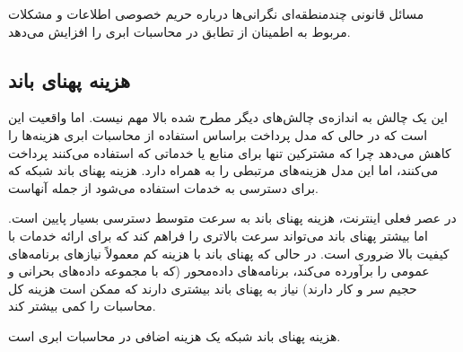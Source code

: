 \documentclass{book}
\begin{document}
    \begin{addinfo}
        
        مسائل قانونی چندمنطقه‌ای نگرانی‌ها درباره حریم خصوصی اطلاعات و مشکلات مربوط به اطمینان از تطابق در محاسبات ابری را افزایش می‌دهد.
        
    \end{addinfo}

    \subsection{هزینه پهنای باند}

        این یک چالش به اندازه‌ی چالش‌های دیگر مطرح شده بالا مهم نیست. اما واقعیت این است که در حالی که مدل پرداخت براساس استفاده از محاسبات ابری هزینه‌ها را کاهش می‌دهد چرا که مشترکین تنها برای منابع یا خدماتی که استفاده می‌کنند پرداخت می‌کنند، اما این مدل هزینه‌های مرتبطی را به همراه دارد. هزینه پهنای باند شبکه که برای دسترسی به خدمات استفاده می‌شود از جمله آنهاست.

        در عصر فعلی اینترنت، هزینه پهنای باند به سرعت متوسط دسترسی بسیار پایین است. اما بیشتر پهنای باند می‌تواند سرعت بالاتری را فراهم کند که برای ارائه خدمات با کیفیت بالا ضروری است. در حالی که پهنای باند با هزینه کم معمولاً نیازهای برنامه‌های عمومی را برآورده می‌کند، برنامه‌های داده‌محور (که با مجموعه داده‌های بحرانی و حجیم سر و کار دارند) نیاز به پهنای باند بیشتری دارند که ممکن است هزینه کل محاسبات را کمی بیشتر کند.

        \begin{addinfo}
            
            هزینه پهنای باند شبکه یک هزینه اضافی در محاسبات ابری است.
            
        \end{addinfo}
        
\end{document}
